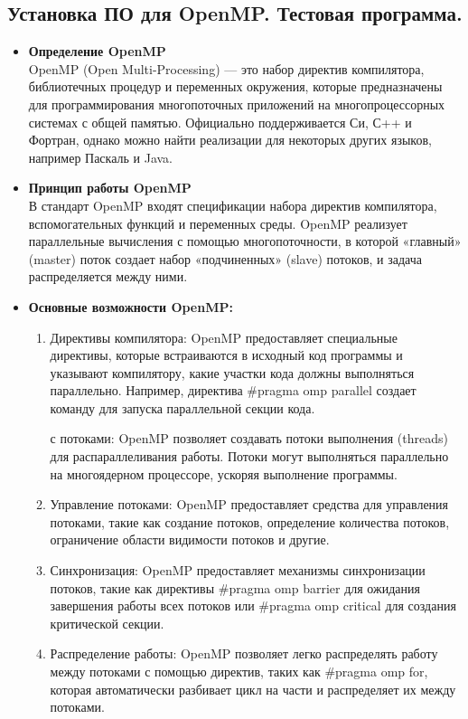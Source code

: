 \documentclass[11pt,a4paper,final]{article}
\begin{document}
\subsection{Установка ПО для OpenMP. Тестовая программа.}
\begin{itemize}
	\item {\bf Определение OpenMP}  \\
	OpenMP (Open Multi-Processing) — это набор директив компилятора, библиотечных процедур и переменных окружения, которые предназначены для программирования многопоточных приложений на многопроцессорных системах с общей памятью. Официально поддерживается Си, С++ и Фортран, однако можно найти реализации для некоторых других языков, например Паскаль и Java. 
	\item {\bf Принцип работы OpenMP}  \\
	В стандарт OpenMP входят спецификации набора директив компилятора, вспомогательных функций и переменных среды. OpenMP реализует параллельные вычисления с помощью многопоточности, в которой «главный» (master) поток создает набор «подчиненных» (slave) потоков, и задача распределяется между ними.
	\item {\bf Основные возможности OpenMP:}
	\begin{enumerate}
		\item Директивы компилятора: OpenMP предоставляет специальные директивы, которые встраиваются в исходный код программы и указывают компилятору, какие участки кода должны выполняться параллельно. Например, директива \#pragma omp parallel создает команду для запуска параллельной секции кода.
		
		 с потоками: OpenMP позволяет создавать потоки выполнения (threads) для распараллеливания работы. Потоки могут выполняться параллельно на многоядерном процессоре, ускоряя выполнение программы.
		
		\item Управление потоками: OpenMP предоставляет средства для управления потоками, такие как создание потоков, определение количества потоков, ограничение области видимости потоков и другие.
		
		\item Синхронизация: OpenMP предоставляет механизмы синхронизации потоков, такие как директивы \#pragma omp barrier для ожидания завершения работы всех потоков или \#pragma omp critical для создания критической секции.
		
		\item Распределение работы: OpenMP позволяет легко распределять работу между потоками с помощью директив, таких как \#pragma omp for, которая автоматически разбивает цикл на части и распределяет их между потоками.
	\end{enumerate}
\end{itemize}
\end{document}
